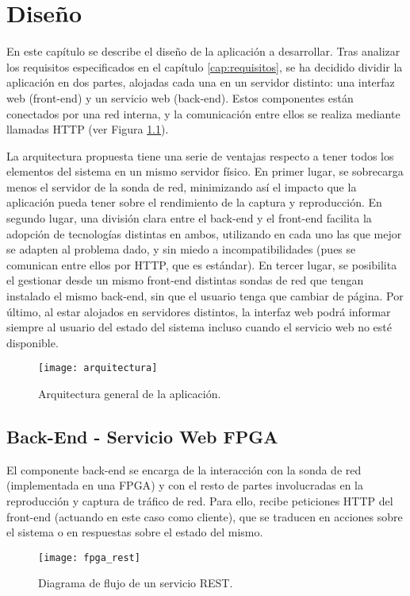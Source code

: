 \chapter{Diseño\label{cap:disenho}}

En este capítulo se describe el diseño de la aplicación a desarrollar.
Tras analizar los requisitos especificados en el capítulo \ref{cap:requisitos}, se ha decidido dividir la aplicación en dos partes, alojadas cada una en un servidor distinto: una interfaz web (\gls{front-end}) y un servicio web (\gls{back-end}).
Estos componentes están conectados por una red interna, y la comunicación entre ellos se realiza mediante llamadas  \gls{HTTP} (ver Figura \ref{fig:arquitectura}).

La arquitectura propuesta tiene una serie de ventajas respecto a tener todos los elementos del sistema en un mismo servidor físico.
En primer lugar, se sobrecarga menos el servidor de la sonda de red, minimizando así el impacto que la aplicación pueda tener sobre el rendimiento de la captura y reproducción.
En segundo lugar, una división clara entre el \gls{back-end} y el \gls{front-end} facilita la adopción de tecnologías distintas en ambos, utilizando en cada uno las que mejor se adapten al problema dado, y sin miedo a incompatibilidades (pues se comunican entre ellos por \gls{HTTP}, que es estándar).
En tercer lugar, se posibilita el gestionar desde un mismo \gls{front-end} distintas sondas de red que tengan instalado el mismo \gls{back-end}, sin que el usuario tenga que cambiar de página.
Por último, al estar alojados en servidores distintos, la interfaz web podrá informar siempre al usuario del estado del sistema incluso cuando el servicio web no esté disponible.

\begin{figure}[!htp]
  \centering
  \texttt{[image: arquitectura]}
  \caption{Arquitectura general de la aplicación.}
  \label{fig:arquitectura}
\end{figure}


\section{Back-End - Servicio Web FPGA\label{sec:dis:servicio_web_fpga}}

El componente \gls{back-end} se encarga de la interacción con la sonda de red (implementada en una \gls{FPGA}) y con el resto de partes involucradas en la reproducción y captura de tráfico de red.
Para ello, recibe peticiones \gls{HTTP} del \gls{front-end} (actuando en este caso como cliente), que se traducen en acciones sobre el sistema o en respuestas sobre el estado del mismo.
\begin{figure}[!htp]
  \centering
  \texttt{[image: fpga\_rest]}
  \caption{Diagrama de flujo de un servicio \gls{REST}.}
  \label{fig:fpga_rest}
\end{figure}

